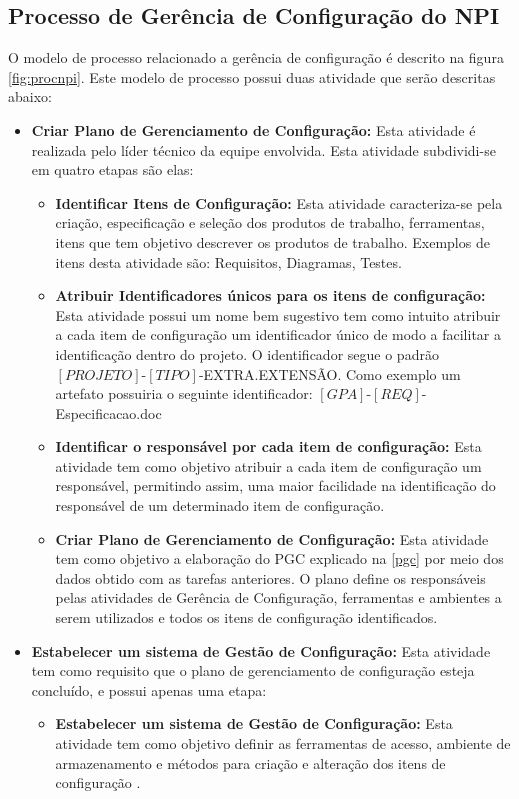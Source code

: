 \subsection{Processo de Gerência de Configuração do NPI}
O modelo de processo relacionado a gerência de configuração é descrito na figura \autoref{fig:procnpi}. Este modelo de processo possui duas atividade que serão descritas abaixo:
\begin{itemize}
\item \textbf{Criar Plano de Gerenciamento de Configuração:} Esta atividade é realizada pelo líder técnico da equipe envolvida. Esta atividade subdividi-se em quatro etapas são elas:
\begin{itemize}
\item \textbf{Identificar Itens de Configuração:} Esta atividade caracteriza-se pela criação, especificação e seleção dos produtos de trabalho, ferramentas, itens que tem objetivo descrever os produtos de trabalho. Exemplos de itens desta atividade são: Requisitos, Diagramas, Testes.

\item \textbf{Atribuir Identificadores únicos para os itens de configuração:} Esta atividade possui um nome bem sugestivo tem como intuito atribuir a cada item de configuração um identificador único de modo a facilitar a identificação dentro do projeto. O identificador segue o padrão $\left[PROJETO\right]$-$\left[TIPO\right]$-EXTRA.EXTENSÃO. Como exemplo um artefato possuiria o seguinte identificador: $\left[GPA\right]$-$\left[REQ\right]$-Especificacao.doc

\item \textbf{Identificar o responsável por cada item de configuração:} Esta atividade tem como objetivo atribuir a cada item de configuração um responsável, permitindo assim, uma maior facilidade na identificação do responsável de um determinado item de configuração.
\item \textbf{Criar	Plano de Gerenciamento de Configuração:} Esta atividade tem como objetivo a elaboração do PGC explicado na \autoref{pgc} por meio dos dados obtido com as tarefas anteriores. O plano define os responsáveis pelas atividades de Gerência de Configuração, ferramentas e ambientes a serem utilizados e todos os itens de configuração identificados.
\end{itemize}
\item \textbf{Estabelecer um sistema de Gestão de Configuração:} Esta atividade tem como requisito que o plano de gerenciamento de configuração esteja concluído, e possui apenas uma etapa:
\begin{itemize}
\item \textbf{Estabelecer um sistema de Gestão de Configuração:} Esta atividade tem como objetivo definir as ferramentas de acesso, ambiente de armazenamento e métodos para criação e alteração dos itens de configuração \cite{processonpi}. 
\end{itemize}
\end{itemize}

